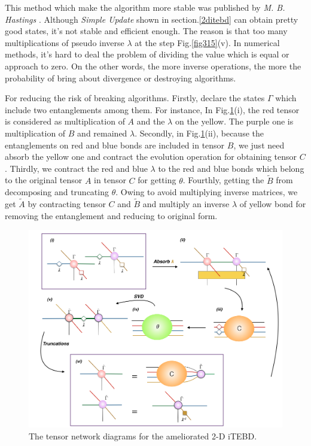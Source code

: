 This method which make the algorithm more stable was published by \textit{M. B. Hastings} \cite{hastings_light-cone_2009}. Although \textit{Simple Update} shown in section.\ref{2ditebd} can obtain pretty good states, it's not stable and efficient enough. The reason is that too many multiplications of pseudo inverse $\lambda$ at the step Fig.\ref{fig315}(v). In numerical methods, it's hard to deal the problem of dividing the value which is equal or approach to zero. On the other words, the more inverse operations, the more the probability of bring about divergence or destroying algorithms.

For reducing the risk of breaking algorithms. Firstly, declare the states $\Gamma$ which include two entanglements among them. For instance, In Fig.\ref{fig317}(i), the red tensor is considered as multiplication of $A$ and the $\lambda$ on the yellow. The purple one is multiplication of $B$ and remained $\lambda$. Secondly, in Fig.\ref{fig317}(ii), because the entanglements on red and blue bonds are included in tensor $B$, we just need absorb the yellow one and contract the evolution operation for obtaining tensor $C$. Thirdly, we contract the red and blue $\lambda$ to the red and blue bonds which belong to the original tensor $A$ in tensor $C$ for getting $\theta$. Fourthly, getting the $\tilde{B}$ from decomposing and truncating $\theta$. Owing to avoid multiplying inverse matrices, we get $\tilde{A}$ by contracting tensor $C$ and $\tilde{B}$ and multiply an inverse $\lambda$ of yellow bond for removing the entanglement and reducing to original form.

	\begin{figure}[ht]
	\centering
	\includegraphics[width=1.00\textwidth]{figures/fig317.png}
	\caption[The tensor network diagrams for the 2-D iTEBD with QR decomposition]{The tensor network diagrams for the ameliorated 2-D iTEBD.}
	\label{fig317}
	\end{figure}


